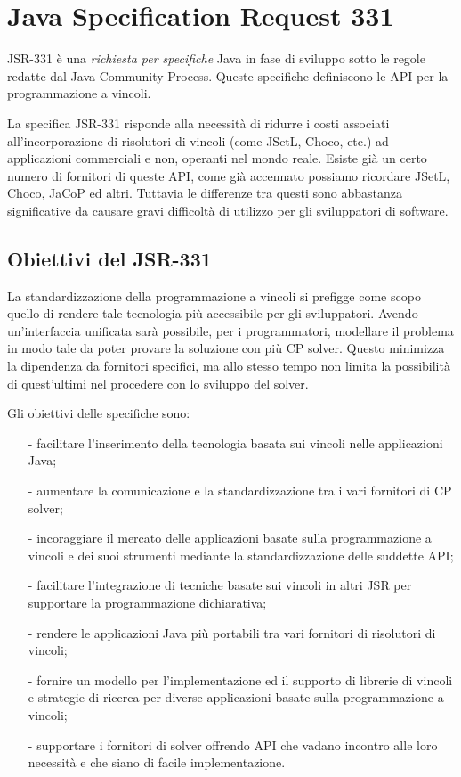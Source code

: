 
\chapter{Java Specification Request 331}\label{capJSR}
JSR-331 è una \emph{richiesta per specifiche} Java in fase di sviluppo sotto
le regole redatte dal Java Community Process. Queste specifiche definiscono
le API per la programmazione a vincoli.

La specifica JSR-331 risponde alla necessità di ridurre i costi associati 
all'incorporazione di risolutori di vincoli (come JSetL, Choco, etc.) ad
applicazioni commerciali e non, operanti nel mondo reale. Esiste già un 
certo numero di fornitori di queste API, come già accennato possiamo
ricordare JSetL, Choco, JaCoP ed altri. Tuttavia le differenze tra questi
sono abbastanza significative da causare gravi difficoltà di utilizzo per 
gli sviluppatori di software.

\section{Obiettivi del JSR-331}
La standardizzazione della programmazione a vincoli si prefigge come scopo
quello di rendere tale tecnologia più accessibile per gli sviluppatori.
Avendo un'interfaccia unificata sarà possibile, per i programmatori, modellare
il problema in modo tale da poter provare la soluzione con più CP solver.
Questo minimizza la dipendenza da fornitori specifici, ma allo stesso
tempo non limita la possibilità di quest'ultimi nel procedere con lo sviluppo
del solver.

Gli obiettivi delle specifiche sono:
\begin{itemize}
\item[-]facilitare l'inserimento della tecnologia basata sui vincoli nelle 
applicazioni Java;
\item[-]aumentare la comunicazione e la standardizzazione tra i vari fornitori
di CP solver;
\item[-]incoraggiare il mercato delle applicazioni basate sulla programmazione
a vincoli e dei suoi strumenti mediante la standardizzazione delle suddette API;
\item[-]facilitare l'integrazione di tecniche basate sui vincoli in altri
JSR per supportare la programmazione dichiarativa;
\item[-]rendere le applicazioni Java più portabili tra vari fornitori di
risolutori di vincoli;
\item[-]fornire un modello per l'implementazione ed il supporto di
librerie di vincoli e strategie di ricerca per diverse applicazioni basate sulla
programmazione a vincoli;
\item[-] supportare i fornitori di solver offrendo API che vadano incontro alle
loro necessità e che siano di facile implementazione.
\end{itemize}

